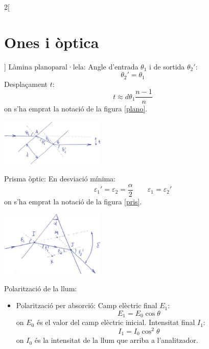 \documentclass[class=article,10pt,crop=false]{standalone}
\begin{document}
\begin{multicols}{2}[\section{Ones i òptica}]
Làmina planoparal·lela:\newline
Angle d'entrada $\theta_1$ i de sortida $\theta_2'$: $$\theta_2'=\theta_1$$
Desplaçament $t$: $$t\approx d\theta_1\frac{n-1}{n}$$
{\footnotesize on s'ha emprat la notació de la figura \ref{plano}.}\newline
\begin{minipage}{\linewidth}
    \includegraphics[width=5cm]{Physics/1st/Waves_and_optics/Images/plano.jpg} 
    \label{plano}
\end{minipage}
Prisma òptic: \newline
En desviació mínima: $$\varepsilon_1'=\varepsilon_2=\frac{\alpha}{2}\qquad\varepsilon_1=\varepsilon_2'$$ {\footnotesize on s'ha emprat la notació de la figura \ref{pris}.}\newline
\begin{minipage}{\linewidth}
    \includegraphics[width=5cm]{Physics/1st/Waves_and_optics/Images/prisma.jpg} 
    \label{pris}
\end{minipage}
Polarització de la llum:
\begin{itemize}
    \item Polarització per absorció:\newline
    Camp elèctric final $E_1$:
    \begin{equation*}
        E_1=E_0\cos\theta
    \end{equation*}
    {\footnotesize on $E_0$ és el valor del camp elèctric inicial.}
    Intensitat final $I_1$:
    \begin{equation*}
        I_1=I_0\cos^2\theta
    \end{equation*}
    {\footnotesize on $I_0$ és la intensitat de la llum que arriba a l'analitzador.}\newline

\end{itemize}
\end{multicols}
\end{document}
